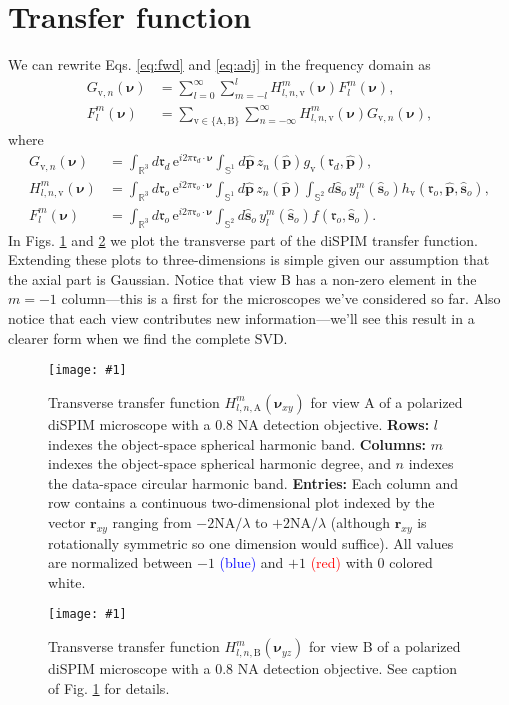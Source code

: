 \documentclass[11pt]{article}
\newcommand{\me}{\mathrm{e}}
\providecommand{\mb}[1]{\mathbf{#1}}
\providecommand{\ro}{\mathbf{\mathfrak{r}}_o}
\providecommand{\so}{\mathbf{\hat{s}}_o}
\providecommand{\rd}{\mathbf{\mathfrak{r}}_d}
\providecommand{\mh}[1]{\mathbf{\hat{#1}}}
\providecommand{\mbb}[1]{\mathbb{#1}}
\providecommand{\bs}[1]{\boldsymbol{#1}}
\providecommand{\tv}{\text{v}}
\providecommand{\tx}[1]{\text{#1}}
\providecommand{\bv}{\bs{\nu}}
\providecommand{\p}{\mh{p}}
\providecommand{\lmsum}{\sum_{l=0}^\infty\sum_{m=-l}^{l}}
\providecommand{\intr}[1]{\int_{\mbb{R}^{#1}}}
\providecommand{\ints}[1]{\int_{\mbb{S}^{#1}}}
\providecommand{\fig}[4]{
\begin{figure}[h]
 \captionsetup{width=1.0\linewidth}
 \centering
 \texttt{[image: \#1]}
 \caption{#3}
 \label{fig:#4}
\end{figure}
}
\begin{document}
\section{Transfer function}
We can rewrite Eqs. \ref{eq:fwd} and \ref{eq:adj} in the frequency domain as
\begin{align}
  G_{\tv, n}(\bv) &= \lmsum H_{l,n,\tv}^{m}(\bv)F_l^m(\bv), \label{eq:ffwd}\\
  F_l^m(\bv) &= \sum_{\tv \in \{\tx{A}, \tx{B}\}}\sum_{n=-\infty}^\infty H_{l,n,\tv}^{m}(\bv)G_{\tv, n}(\bv) \label{eq:fadj},
\end{align}
where
\begin{align}
  G_{\tv, n}(\bv) &= \intr{3}d\rd\, \me^{i2\pi\rd\cdot\bv}\ints{1}d\p\, z_n(\p) g_{\tv}(\rd, \p),\\
  H_{l,n,\tv}^m(\bv) &= \intr{3}d\ro\, \me^{i2\pi\ro\cdot\bv}\ints{1}d\p\, z_n(\p)\ints{2}d\so\, y_l^m(\so) h_{\tv}(\ro, \p, \so),\\
  F_l^m(\bv) &= \intr{3}d\ro\, \me^{i2\pi\ro\cdot\bv}\ints{2}d\so\, y_l^m(\so) f(\ro, \so).
\end{align}
In Figs. \ref{fig:tfA} and \ref{fig:tfB} we plot the transverse part of the
diSPIM transfer function. Extending these plots to three-dimensions is simple
given our assumption that the axial part is Gaussian. Notice that view B has a
non-zero element in the $m=-1$ column---this is a first for the microscopes
we've considered so far. Also notice that each view contributes new
information---we'll see this result in a clearer form when we find the complete
SVD.

\fig{../calculations/out/Hillx.pdf}{1.0}{Transverse transfer function
  $H_{l,n,\tx{A}}^m(\bv_{xy})$ for view A of a polarized diSPIM microscope with
  a 0.8 NA detection objective. \textbf{Rows:} $l$ indexes the object-space
  spherical harmonic band. \textbf{Columns:} $m$ indexes the object-space
  spherical harmonic degree, and $n$ indexes the data-space circular harmonic
  band. \textbf{Entries:} Each column and row contains a continuous
  two-dimensional plot indexed by the vector $\mb{r}_{xy}$ ranging from
  $-2\text{NA}/\lambda$ to $+2\text{NA}/\lambda$ (although $\mb{r}_{xy}$ is
  rotationally symmetric so one dimension would suffice). All values are
  normalized between $-1$ \textcolor{blue}{(blue)} and $+1$
  \textcolor{red}{(red)} with $0$ colored white.}{tfA}

\fig{../calculations/out/Hillz.pdf}{1.0}{Transverse transfer function
  $H_{l,n,\tx{B}}^m(\bv_{yz})$ for view B of a polarized diSPIM microscope with
  a 0.8 NA detection objective. See caption of Fig. \ref{fig:tfA} for
  details.}{tfB}
\end{document}
